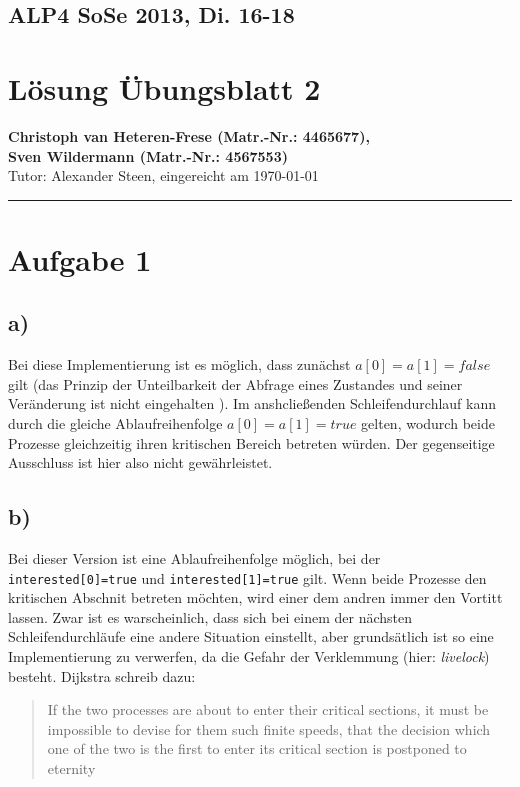 \documentclass[11pt,a4paper,DIV=10,]{scrartcl}
\begin{document}
\onecolumn
\subsection*{ALP4 SoSe 2013, Di. 16-18}
\section*{Lösung Übungsblatt 2}
\textbf{Christoph van Heteren-Frese (Matr.-Nr.: 4465677), \\ Sven Wildermann (Matr.-Nr.: 4567553)}\\
Tutor: Alexander Steen, eingereicht am \today\\
\hrule

\section*{Aufgabe 1}
\subsection*{a)}
Bei diese Implementierung ist es möglich, dass zunächst $a[0]=a[1]=false$ gilt (das Prinzip der Unteilbarkeit der Abfrage eines Zustandes und seiner Veränderung ist nicht eingehalten \cite[vgl.][S. 39]{Maurer.2012}). Im anshcließenden Schleifendurchlauf kann durch die glei\-che Ablaufreihenfolge $a[0]=a[1]=true$ gelten, wodurch beide Prozesse gleichzeitig ihren kritischen Bereich betreten würden. Der gegenseitige Ausschluss ist hier also nicht gewährleistet. 
\subsection*{b)}
Bei dieser Version ist eine Ablaufreihenfolge möglich, bei der \texttt{interested[0]=true} und \texttt{interested[1]=true} gilt. Wenn beide Prozesse den kritischen Abschnit betreten möchten, wird einer dem andren immer den Vortitt lassen. Zwar ist es warscheinlich, dass sich bei einem der nächsten Schleifendurchläufe eine andere Situation einstellt, aber grundsätlich ist so eine Implementierung zu verwerfen, da die Gefahr der Verklemmung (hier: \textit{livelock}) besteht. Dijkstra schreib dazu: \begin{quote}\glqq If the two processes are about to enter their critical sections, it must be impossible to devise for them such finite speeds, that the decision which one of the two is the first to enter its critical section is postponed to eternity\grqq \\ \cite[vgl.][S. 80]{Dijkstra.1965}\end{quote}
\end{document}
